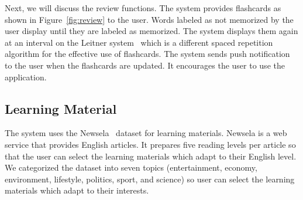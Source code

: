 \documentclass[sigchi]{acmart}
\begin{document}
Next, we will discuss the review functions. The system provides flashcards as shown in Figure~\ref{fig:review} to the user. Words labeled as not memorized by the user display until they are labeled as memorized. The system displays them again at an interval on the Leitner system~\cite{leitner1972so} which is a different spaced repetition algorithm for the effective use of flashcards. The system sends push notification to the user when the flashcards are updated. It encourages the user to use the application.

\subsection{Learning Material}
The system uses the Newsela~\cite{xu2015problems} dataset for learning materials. Newsela is a web service that provides English articles. It prepares five reading levels per article so that the user can select the learning materials which adapt to their English level.
We categorized the dataset into seven topics (entertainment,
economy, environment, lifestyle, politics, sport, and science) so user can select the learning materials which adapt to their interests.
\begin{comment}
\subsection{Learning Records}
Figure~\ref{fig:stats} shows the user interface to check the leaning achievement. The system displays the total number of words read by user through the application. The total number of words is shown in a graph for the past week. The data is updated every time user reads an article.
\end{comment}
\end{document}

